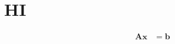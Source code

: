 \documentclass{article}
\begin{document}
\section{HI}
\begin{align}
 \mathbf{A}\mathbf{x} &= \mathbf{b}
\end{align}
\end{document}
